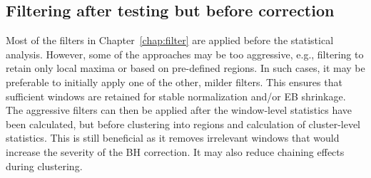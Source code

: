 \documentclass{report}\usepackage[]{graphicx}\usepackage[usenames,dvipsnames]{color}
\newcommand{\hlnum}[1]{\textcolor[rgb]{0.816,0.125,0.439}{#1}}%
\newcommand{\hlopt}[1]{\textcolor[rgb]{0,0,0}{#1}}%
\newcommand{\hlstd}[1]{\textcolor[rgb]{0.251,0.251,0.251}{#1}}%
\newcommand{\hlkwb}[1]{\textcolor[rgb]{0,0,0}{#1}}%
\newcommand{\hlkwc}[1]{\textcolor[rgb]{0.251,0.251,0.251}{#1}}%
\newcommand{\hlkwd}[1]{\textcolor[rgb]{0.878,0.439,0.125}{#1}}%
\newenvironment{knitrout}{}{} %
\begin{document}
\begin{knitrout}
\color{fgcolor}
\end{knitrout}

\subsection{Filtering after testing but before correction}
Most of the filters in Chapter~\ref{chap:filter} are applied before the statistical analysis.
However, some of the approaches may be too aggressive, e.g., filtering to retain only local maxima or based on pre-defined regions.
In such cases, it may be preferable to initially apply one of the other, milder filters.
This ensures that sufficient windows are retained for stable normalization and/or EB shrinkage.
The aggressive filters can then be applied after the window-level statistics have been calculated, but before clustering into regions and calculation of cluster-level statistics.
This is still beneficial as it removes irrelevant windows that would increase the severity of the BH correction.
It may also reduce chaining effects during clustering.
\end{document}

